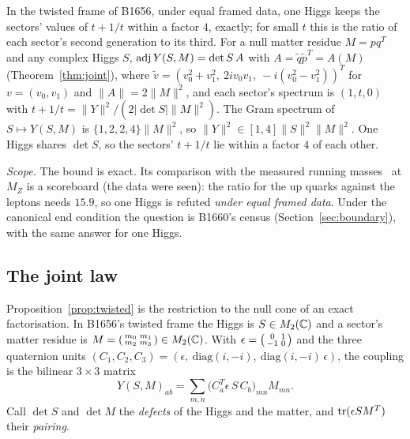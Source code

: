 \begin{proposition}\label{prop:twisted}
In the twisted frame of B1656, under equal framed data, one Higgs keeps the sectors' values of $t+1/t$ within a factor
$4$, exactly; for small $t$ this is the ratio of each sector's second generation to its third. For a null matter residue $M=pq^T$ and any complex Higgs $S$, $\operatorname{adj} Y(S,M)=\det S\,A$ with $A=\tilde q\tilde p^T=A(M)$ (Theorem~\ref{thm:joint}), where
$\tilde v=(v_0^2+v_1^2,\ 2iv_0v_1,\ -i(v_0^2-v_1^2))^T$ for $v=(v_0,v_1)$ and
$\|A\|=2\|M\|^2$, and each sector's spectrum is $(1,t,0)$ with $t+1/t=\|Y\|^2/(2|\det S|\|M\|^2)$. The Gram spectrum of $S\mapsto Y(S,M)$ is
$\{1,2,2,4\}\|M\|^2$, so $\|Y\|^2\in[1,4]\|S\|^2\|M\|^2$. One Higgs shares $\det S$, so the sectors' $t+1/t$ lie within a
factor $4$ of each other.
\end{proposition}
\noindent\emph{Scope.} The bound is exact. Its comparison with the measured running masses~\cite{HuangZhou2021} at $M_Z$
is a scoreboard (the data were seen): the ratio for the up quarks against the leptons needs $15.9$, so one Higgs is
refuted \emph{under equal framed data}. Under the canonical end condition the question is B1660's census
(Section~\ref{sec:boundary}), with the same answer for one Higgs.

\subsection{The joint law}\label{sec:joint}

Proposition~\ref{prop:twisted} is the restriction to the null cone of an exact factorisation. In B1656's twisted frame
the Higgs is $S\in M_2(\mathbb{C})$ and a sector's matter residue is $M=\begin{psmallmatrix}m_0&m_1\\m_2&m_3\end{psmallmatrix}\in M_2(\mathbb{C})$.
With $\epsilon=\begin{psmallmatrix}0&1\\-1&0\end{psmallmatrix}$ and the three quaternion units
$(C_1,C_2,C_3)=(\epsilon,\ \mathrm{diag}(i,-i),\ \mathrm{diag}(i,-i)\,\epsilon)$, the coupling is the bilinear $3\times3$ matrix
\[
  Y(S,M)_{ab}=\sum_{m,n}\bigl(C_a^{T}\epsilon\,S\,C_b\bigr)_{mn}M_{mn}.
\]
Call $\det S$ and $\det M$ the \emph{defects} of the Higgs and the matter, and $\operatorname{tr}(\epsilon SM^T)$ their \emph{pairing}.


